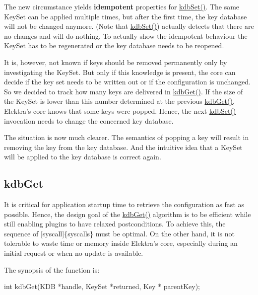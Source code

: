 The new circumstance yields {\bfseries idempotent} properties for {\ttfamily \hyperlink{group__kdb_ga11436b058408f83d303ca5e996832bcf}{kdb\+Set()}}. The same {\ttfamily Key\+Set} can be applied multiple times, but after the first time, the key database will not be changed anymore. (Note that {\ttfamily \hyperlink{group__kdb_ga11436b058408f83d303ca5e996832bcf}{kdb\+Set()}}) actually detects that there are no changes and will do nothing. To actually show the idempotent behaviour the Key\+Set has to be regenerated or the key database needs to be reopened.

It is, however, not known if keys should be removed permanently only by investigating the {\ttfamily Key\+Set}. But only if this knowledge is present, the core can decide if the key set needs to be written out or if the configuration is unchanged. So we decided to track how many keys are delivered in {\ttfamily \hyperlink{group__kdb_ga28e385fd9cb7ccfe0b2f1ed2f62453a1}{kdb\+Get()}}. If the size of the {\ttfamily Key\+Set} is lower than this number determined at the previous {\ttfamily \hyperlink{group__kdb_ga28e385fd9cb7ccfe0b2f1ed2f62453a1}{kdb\+Get()}}, Elektra's core knows that some keys were popped. Hence, the next {\ttfamily \hyperlink{group__kdb_ga11436b058408f83d303ca5e996832bcf}{kdb\+Set()}} invocation needs to change the concerned key database.

The situation is now much clearer. The semantics of popping a key will result in removing the key from the key database. And the intuitive idea that a {\ttfamily Key\+Set} will be applied to the key database is correct again.

\subsection*{kdb\+Get}

It is critical for application startup time to retrieve the configuration as fast as possible. Hence, the design goal of the {\ttfamily \hyperlink{group__kdb_ga28e385fd9cb7ccfe0b2f1ed2f62453a1}{kdb\+Get()}} algorithm is to be efficient while still enabling plugins to have relaxed postconditions. To achieve this, the sequence of \mbox{[}syscall\mbox{]}\{syscalls\} must be optimal. On the other hand, it is not tolerable to waste time or memory inside Elektra's core, especially during an initial request or when no update is available.

The synopsis of the function is\+: \begin{DoxyVerb}    int kdbGet(KDB *handle, KeySet *returned, Key * parentKey);
\end{DoxyVerb}


